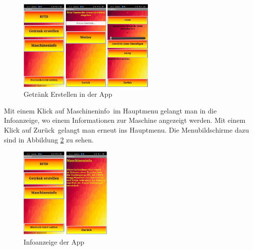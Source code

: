 \begin{figure}[h!]
	\centering
	\includegraphics[width=0.6\textwidth]{graphics/AppErstellen}
	\caption{Getränk Erstellen in der App}
	\label{fig:AppErstellen}
\end{figure}

\newpage

Mit einem Klick auf \flqq Maschineninfo\frqq~im Hauptmenu gelangt man in die Infoanzeige, wo einem Informationen zur Maschine angezeigt werden. Mit einem Klick auf \flqq Zurück\frqq~gelangt man erneut ins Hauptmenu. Die Menubildschirme dazu sind in Abbildung \ref{fig:AppInfo} zu sehen.

\begin{figure}[h!]
	\centering
	\includegraphics[width=0.4\textwidth]{graphics/AppInfo}
	\caption{Infoanzeige der App}
	\label{fig:AppInfo}
\end{figure}

 
